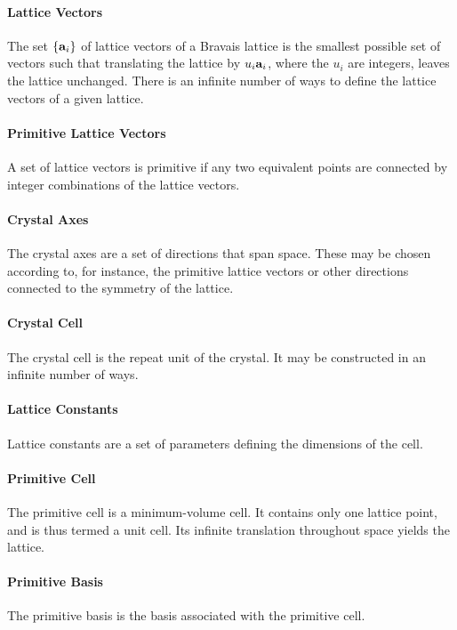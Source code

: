 
\paragraph{Lattice Vectors}
The set $\{\vb{a}_{i}\}$ of lattice vectors of a Bravais lattice is the smallest possible set of vectors such that translating the lattice by $u_{i}\vb{a}_{i}$, where the $u_{i}$ are integers, leaves the lattice unchanged. There is an infinite number of ways to define the lattice vectors of a given lattice.

\paragraph{Primitive Lattice Vectors}
A set of lattice vectors is primitive if any two equivalent points are connected by integer combinations of the lattice vectors.

\paragraph{Crystal Axes}
The crystal axes are a set of directions that span space. These may be chosen according to, for instance, the primitive lattice vectors or other directions connected to the symmetry of the lattice.

\paragraph{Crystal Cell}
The crystal cell is the repeat unit of the crystal. It may be constructed in an infinite number of ways.

\paragraph{Lattice Constants}
Lattice constants are a set of parameters defining the dimensions of the cell.

\paragraph{Primitive Cell}
The primitive cell is a minimum-volume cell. It contains only one lattice point, and is thus termed a unit cell. Its infinite translation throughout space yields the lattice.

\paragraph{Primitive Basis}
The primitive basis is the basis associated with the primitive cell.

